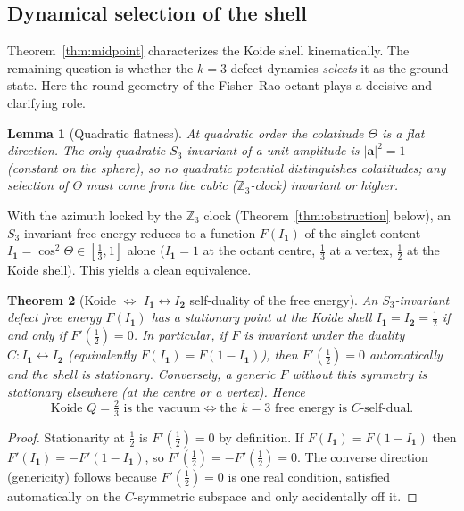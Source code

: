 \documentclass[12pt]{article}
\newtheorem{theorem}{Theorem}[section]
\newtheorem{lemma}[theorem]{Lemma}
\theoremstyle{definition}
\theoremstyle{remark}
\begin{document}
\subsection{Dynamical selection of the shell}
\label{sec:dynamical}

Theorem~\ref{thm:midpoint} characterizes the Koide shell kinematically. The
remaining question is whether the $k=3$ defect dynamics \emph{selects} it as
the ground state. Here the round geometry of the Fisher--Rao octant plays a
decisive and clarifying role.

\begin{lemma}[Quadratic flatness]
\label{lem:flat}
At quadratic order the colatitude $\Theta$ is a flat direction. The only
quadratic $S_3$-invariant of a unit amplitude is $|\boldsymbol a|^2=1$
(constant on the sphere), so no quadratic potential distinguishes colatitudes;
any selection of $\Theta$ must come from the cubic ($\mathbb{Z}_3$-clock)
invariant or higher.
\end{lemma}

With the azimuth locked by the $\mathbb{Z}_3$ clock (Theorem~\ref{thm:obstruction}
below), an $S_3$-invariant free energy reduces to a function $F(I_{\mathbf 1})$
of the singlet content $I_{\mathbf 1}=\cos^2\Theta\in[\tfrac13,1]$ alone
($I_{\mathbf 1}=1$ at the octant centre, $\tfrac13$ at a vertex, $\tfrac12$ at
the Koide shell). This yields a clean equivalence.

\begin{theorem}[Koide $\iff$ $I_{\mathbf 1}\!\leftrightarrow\!I_{\mathbf 2}$ self-duality of the free energy]
\label{thm:equiv}
An $S_3$-invariant defect free energy $F(I_{\mathbf 1})$ has a stationary point
at the Koide shell $I_{\mathbf 1}=I_{\mathbf 2}=\tfrac12$ if and only if
$F'(\tfrac12)=0$. In particular, if $F$ is invariant under the duality
$C:I_{\mathbf 1}\leftrightarrow I_{\mathbf 2}$ (equivalently $F(I_{\mathbf 1})
=F(1-I_{\mathbf 1})$), then $F'(\tfrac12)=0$ automatically and the shell is
stationary. Conversely, a generic $F$ without this symmetry is stationary
elsewhere (at the centre or a vertex). Hence
\begin{equation}
\text{Koide } Q=\tfrac23 \text{ is the vacuum}
\iff
\text{the } k=3 \text{ free energy is } C\text{-self-dual.}
\end{equation}
\end{theorem}

\begin{proof}
Stationarity at $\tfrac12$ is $F'(\tfrac12)=0$ by definition. If
$F(I_{\mathbf 1})=F(1-I_{\mathbf 1})$ then $F'(I_{\mathbf 1})=-F'(1-I_{\mathbf 1})$,
so $F'(\tfrac12)=-F'(\tfrac12)=0$. The converse direction (genericity) follows
because $F'(\tfrac12)=0$ is one real condition, satisfied automatically on the
$C$-symmetric subspace and only accidentally off it.
\end{proof}
\end{document}
